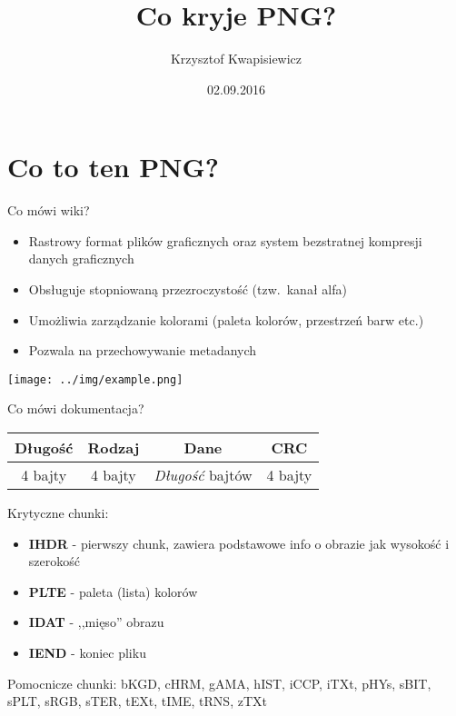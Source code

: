 \documentclass[]{beamer}
\title[Co kryje PNG?]{Co kryje PNG?}
\author[Krzysztof Kwapisiewicz]{Krzysztof Kwapisiewicz}
\institute{Software Engineer @ Codilime}
\date{02.09.2016}
\begin{document}
\begin{frame}
  \begin{titlepage}
  \end{titlepage}
\end{frame}

\section[Co to ten PNG?]{Co to ten PNG?}
\begin{frame}{Co mówi wiki?}
  \begin{itemize}
    \item Rastrowy format plików graficznych oraz system bezstratnej kompresji danych graficznych
    \item Obsługuje stopniowaną przezroczystość (tzw.\ kanał alfa)
    \item Umożliwia zarządzanie kolorami (paleta kolorów, przestrzeń barw etc.)
    \item Pozwala na przechowywanie metadanych
  \end{itemize}
  \begin{center}
    \texttt{[image: ../img/example.png]}
  \end{center}
\end{frame}

\begin{frame}{Co mówi dokumentacja?}
  \begin{center}
    \begin{tabular}{|c|c|c|c|}
      \hline
      \textbf{Długość} & \textbf{Rodzaj} & \textbf{Dane} & \textbf{CRC} \\
      \hline
      4 bajty & 4 bajty & \textit{Długość} bajtów & 4 bajty \\
      \hline
    \end{tabular}
  \end{center}
\end{frame}

\begin{frame}
  Krytyczne chunki:
  \begin{itemize}
    \item \textbf{IHDR} - pierwszy chunk, zawiera podstawowe info o obrazie jak wysokość i szerokość
    \item \textbf{PLTE} - paleta (lista) kolorów
    \item \textbf{IDAT} - ,,mięso'' obrazu
    \item \textbf{IEND} - koniec pliku
  \end{itemize}

  Pomocnicze chunki: bKGD, cHRM, gAMA, hIST, iCCP, iTXt, pHYs, sBIT, sPLT, sRGB, sTER, tEXt, tIME, tRNS, zTXt
\end{frame}
\end{document}

